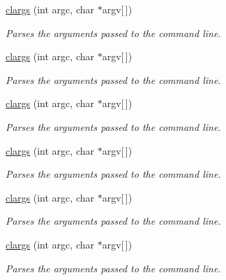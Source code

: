 \begin{DoxyCompactItemize}
\hyperlink{structclargs_ac5a54b5b965289a3ad0766317ae630dd}{clargs} (int argc, char $\ast$argv\mbox{[}$\,$\mbox{]})
\begin{DoxyCompactList}\small\item\em Parses the arguments passed to the command line. \item\end{DoxyCompactList}\item 
\hyperlink{structclargs_ac5a54b5b965289a3ad0766317ae630dd}{clargs} (int argc, char $\ast$argv\mbox{[}$\,$\mbox{]})
\begin{DoxyCompactList}\small\item\em Parses the arguments passed to the command line. \item\end{DoxyCompactList}\item 
\hyperlink{structclargs_ac5a54b5b965289a3ad0766317ae630dd}{clargs} (int argc, char $\ast$argv\mbox{[}$\,$\mbox{]})
\begin{DoxyCompactList}\small\item\em Parses the arguments passed to the command line. \item\end{DoxyCompactList}\item 
\hyperlink{structclargs_ac5a54b5b965289a3ad0766317ae630dd}{clargs} (int argc, char $\ast$argv\mbox{[}$\,$\mbox{]})
\begin{DoxyCompactList}\small\item\em Parses the arguments passed to the command line. \item\end{DoxyCompactList}\item 
\hyperlink{structclargs_ac5a54b5b965289a3ad0766317ae630dd}{clargs} (int argc, char $\ast$argv\mbox{[}$\,$\mbox{]})
\begin{DoxyCompactList}\small\item\em Parses the arguments passed to the command line. \item\end{DoxyCompactList}\item 
\hyperlink{structclargs_ac5a54b5b965289a3ad0766317ae630dd}{clargs} (int argc, char $\ast$argv\mbox{[}$\,$\mbox{]})
\begin{DoxyCompactList}\small\item\em Parses the arguments passed to the command line. \item\end{DoxyCompactList}\item 

\end{DoxyCompactItemize}
